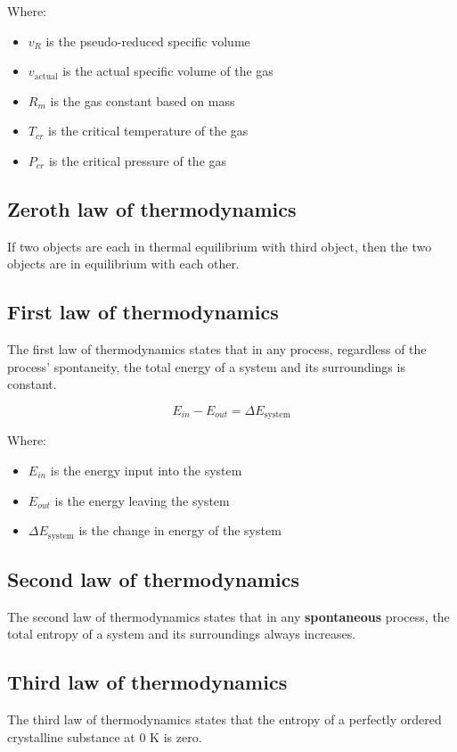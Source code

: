 \documentclass[11pt]{article}
\begin{document}
Where:
\begin{itemize}
\item \(v_R\) is the pseudo-reduced specific volume
\item \(v_{\text{actual}}\) is the actual specific volume of the gas
\item \(R_m\) is the gas constant based on mass
\item \(T_{cr}\) is the critical temperature of the gas
\item \(P_{cr}\) is the critical pressure of the gas
\end{itemize}

\subsection{Zeroth law of thermodynamics}
\label{sec:org62b3e43}
If two objects are each in thermal equilibrium with third object, then the two objects are in equilibrium with each other.

\subsection{First law of thermodynamics}
\label{sec:org99e52fb}
The first law of thermodynamics states that in any process, regardless of the process' spontaneity, the total energy of a system and its surroundings is constant.

\[E_{in} - E_{out} = \Delta E_{\text{system}}\]

Where:
\begin{itemize}
\item \(E_{in}\) is the energy input into the system
\item \(E_{out}\) is the energy leaving the system
\item \(\Delta E_{\text{system}}\) is the change in energy of the system
\end{itemize}

\subsection{Second law of thermodynamics}
\label{sec:org21f90d8}
The second law of thermodynamics states that in any \textbf{spontaneous} process, the total entropy of a system and its surroundings always increases.

\subsection{Third law of thermodynamics}
\label{sec:org7513339}
The third law of thermodynamics states that the entropy of a perfectly ordered crystalline substance at 0 K is zero.
\end{document}
